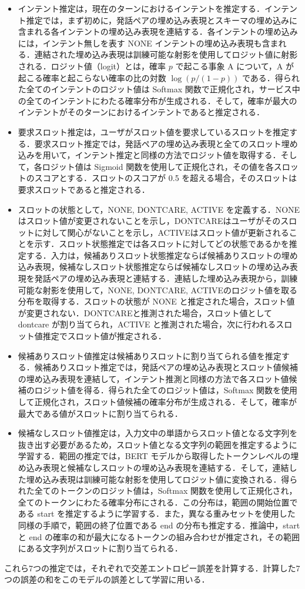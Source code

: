 \begin{itemize}
    \item
    インテント推定は，現在のターンにおけるインテントを推定する．インテント推定では，まず初めに，発話ペアの埋め込み表現とスキーマの埋め込みに含まれる各インテントの埋め込み表現を連結する．各インテントの埋め込みには，インテント無しを表す NONE インテントの埋め込み表現も含まれる．連結された埋め込み表現は訓練可能な射影を使用してロジット値に射影される．ロジット値（logit）とは，確率 $p$ で起こる事象 A について，A が起こる確率と起こらない確率の比の対数 $\log(p / (1-p))$ である．得られた全てのインテントのロジット値は Softmax 関数で正規化され，サービス中の全てのインテントにわたる確率分布が生成される．そして，確率が最大のインテントがそのターンにおけるインテントであると推定される．
    \item
    要求スロット推定は，ユーザがスロット値を要求しているスロットを推定する．要求スロット推定では，発話ペアの埋め込み表現と全てのスロット埋め込みを用いて，インテント推定と同様の方法でロジット値を取得する．そして，各ロジット値は Sigmoid 関数を使用して正規化され，その値を各スロットのスコアとする．スロットのスコアが 0.5 を超える場合，そのスロットは要求スロットであると推定される．
    \item
    スロットの状態として，NONE, DONTCARE, ACTIVE を定義する．NONEはスロット値が変更されないことを示し，DONTCAREはユーザがそのスロットに対して関心がないことを示し，ACTIVEはスロット値が更新されることを示す．スロット状態推定では各スロットに対してどの状態であるかを推定する．入力は，候補ありスロット状態推定ならば候補ありスロットの埋め込み表現，候補なしスロット状態推定ならば候補なしスロットの埋め込み表現を発話ペアの埋め込み表現と連結する．連結した埋め込み表現から，訓練可能な射影を使用して，NONE, DONTCARE, ACTIVEのロジット値を取る分布を取得する．スロットの状態が NONE と推定された場合，スロット値が変更されない．DONTCAREと推測された場合，スロット値として dontcare が割り当てられ，ACTIVE と推測された場合，次に行われるスロット値推定でスロット値が推定される．
    \item
    候補ありスロット値推定は候補ありスロットに割り当てられる値を推定する．候補ありスロット推定では，発話ペアの埋め込み表現とスロット値候補の埋め込み表現を連結して，インテント推測と同様の方法で各スロット値候補のロジット値を得る．得られた全てのロジット値は，Softmax 関数を使用して正規化され，スロット値候補の確率分布が生成される．そして，確率が最大である値がスロットに割り当てられる．
    \item
    候補なしスロット値推定は，入力文中の単語からスロット値となる文字列を抜き出す必要があるため，スロット値となる文字列の範囲を推定するように学習する．範囲の推定では，BERT モデルから取得したトークンレベルの埋め込み表現と候補なしスロットの埋め込み表現を連結する．そして，連結した埋め込み表現は訓練可能な射影を使用してロジット値に変換される．得られた全てのトークンのロジット値は，Softmax 関数を使用して正規化され，全てのトークンにわたる確率分布にされる．この分布は，範囲の開始位置である start を推定するように学習する．また，異なる重みセットを使用した同様の手順で，範囲の終了位置である end の分布も推定する．推論中，start と end の確率の和が最大になるトークンの組み合わせが推定され，その範囲にある文字列がスロットに割り当てられる．
\end{itemize}
\par
これら7つの推定では，それぞれで交差エントロピー誤差を計算する．計算した7つの誤差の和をこのモデルの誤差として学習に用いる．